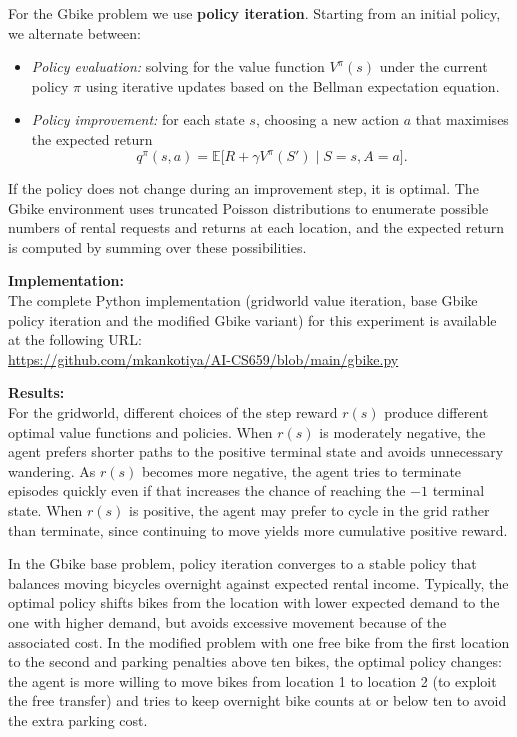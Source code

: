 \documentclass[14pt]{extreport}
\begin{document}
For the Gbike problem we use \textbf{policy iteration}. Starting from an
initial policy, we alternate between:
\begin{itemize}
  \item \emph{Policy evaluation:} solving for the value function $V^\pi(s)$
  under the current policy $\pi$ using iterative updates based on the Bellman
  expectation equation.
  \item \emph{Policy improvement:} for each state $s$, choosing a new action
  $a$ that maximises the expected return
  \[
  q^{\pi}(s,a) = \mathbb{E}\bigl[R + \gamma V^\pi(S') \mid S=s, A=a\bigr].
  \]
\end{itemize}
If the policy does not change during an improvement step, it is optimal.
The Gbike environment uses truncated Poisson distributions to enumerate
possible numbers of rental requests and returns at each location, and the
expected return is computed by summing over these possibilities.

\vspace{1em}

\noindent\textbf{Implementation:}\\
The complete Python implementation (gridworld value iteration, base Gbike
policy iteration and the modified Gbike variant) for this experiment is
available at the following URL:\\[0.3em]
\hspace*{1em}\url{https://github.com/mkankotiya/AI-CS659/blob/main/gbike.py}

\vspace{1em}

\noindent\textbf{Results:}\\
For the gridworld, different choices of the step reward $r(s)$ produce
different optimal value functions and policies. When $r(s)$ is moderately
negative, the agent prefers shorter paths to the positive terminal state and
avoids unnecessary wandering. As $r(s)$ becomes more negative, the agent
tries to terminate episodes quickly even if that increases the chance of
reaching the $-1$ terminal state. When $r(s)$ is positive, the agent may
prefer to cycle in the grid rather than terminate, since continuing to move
yields more cumulative positive reward.

In the Gbike base problem, policy iteration converges to a stable policy that
balances moving bicycles overnight against expected rental income. Typically,
the optimal policy shifts bikes from the location with lower expected demand
to the one with higher demand, but avoids excessive movement because of the
associated cost. In the modified problem with one free bike from the first
location to the second and parking penalties above ten bikes, the optimal
policy changes: the agent is more willing to move bikes from location 1 to
location 2 (to exploit the free transfer) and tries to keep overnight bike
counts at or below ten to avoid the extra parking cost.
\end{document}
